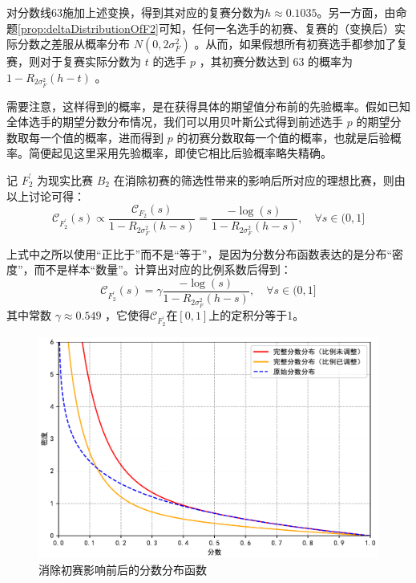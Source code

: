             对分数线63施加上述变换，得到其对应的复赛分数为$h\approx 0.1035$。另一方面，由命题\ref{prop:deltaDistributionOfF2}可知，任何一名选手的初赛、复赛的（变换后）实际分数之差服从概率分布 $N(0,2\sigma_F^2)$ 。从而，如果假想所有初赛选手都参加了复赛，则对于复赛实际分数为 $t$ 的选手 $p$ ，其初赛分数达到 63 的概率为 $1-R_{2\sigma_F^2}(h-t)$ 。
            
            需要注意，这样得到的概率，是在获得具体的期望值分布前的先验概率。假如已知全体选手的期望分数分布情况，我们可以用贝叶斯公式得到前述选手 $p$ 的期望分数取每一个值的概率，进而得到 $p$ 的初赛分数取每一个值的概率，也就是后验概率。简便起见这里采用先验概率，即使它相比后验概率略失精确。

            记 $F_2^\prime$ 为现实比赛 $B_2$ 在消除初赛的筛选性带来的影响后所对应的理想比赛，则由以上讨论可得：
            $$
            \mathcal{C}_{F_2^\prime}(s)\propto\frac{\mathcal{C}_{F_2}(s)}{1-R_{2\sigma_F^2}(h-s)}=\frac{-\log(s)}{1-R_{2\sigma_F^2}(h-s)},\quad\forall s\in (0,1]
            $$

            上式中之所以使用“正比于”而不是“等于”，是因为分数分布函数表达的是分布“密度”，而不是样本“数量”。计算出对应的比例系数后得到：
            $$
            \mathcal{C}_{F_2^\prime}(s)=\gamma\frac{-\log(s)}{1-R_{2\sigma_F^2}(h-s)},\quad\forall s\in (0,1]
            $$
            其中常数 $\gamma\approx0.549$ ，它使得$\mathcal{C}_{F_2^\prime}$在$[0,1]$上的定积分等于1。

            \begin{figure}[htbp]
                \centering
                \includegraphics[width=\textwidth]{fig/plottingNewNoipScores.pdf}
                \caption{消除初赛影响前后的分数分布函数}
                \label{fig:curvesBeforeAndAfterCountering}
            \end{figure}

